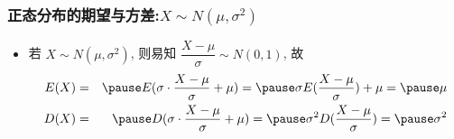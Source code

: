 	\begin{frame}
		\frametitle{正态分布的期望与方差:$X\sim N (\mu,\sigma^2)$}
		\begin{itemize}
			\item 若 $X\sim N (\mu,\sigma^2)$, 则易知 $\dfrac{X-\mu}{\sigma}\sim N (0,1)$, 故
			\begin{eqnarray*}
				E(X)&=&\pause E(\sigma \cdot \dfrac{X-\mu}{\sigma}+\mu )=\pause \sigma E(\dfrac{X-\mu}{\sigma})+\mu=\pause \mu\\
				D(X)&=&\pause D(\sigma \cdot \dfrac{X-\mu}{\sigma}+\mu )=\pause \sigma^2 D(\dfrac{X-\mu}{\sigma})=\pause \sigma^2
			\end{eqnarray*}

		\end{itemize}
	\end{frame}


